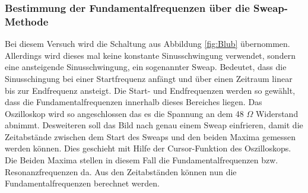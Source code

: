 \subsubsection{Bestimmung der Fundamentalfrequenzen über die Sweap-Methode}
Bei diesem Versuch wird die Schaltung aus Abbildung \ref{fig:Blub} übernommen. Allerdings wird dieses mal keine konstante Sinusschwingung verwendet, sondern eine ansteigende Sinusschwingung, ein sogenannter Sweap. Bedeutet, dass die Sinusschingung bei einer Startfrequenz anfängt und über einen Zeitraum linear bis zur Endfrequenz ansteigt. Die Start- und Endfrequenzen werden so gewählt, dass die Fundamentalfrequenzen innerhalb dieses Bereiches liegen. Das Oszilloskop wird so angeschlossen das es die Spannung an dem 48 $\Omega$ Widerstand abnimmt. Desweiteren soll das Bild nach genau einem Sweap einfrieren, damit die Zeitabstände zwischen dem Start des Sweaps und den beiden Maxima gemessen werden können. Dies geschieht mit Hilfe der Cursor-Funktion des Oszilloskops. Die Beiden Maxima stellen in diesem Fall die Fundamentalfrequenzen bzw. Resonanzfrequenzen da. Aus den Zeitabständen können nun die Fundamentalfrequenzen berechnet werden.
